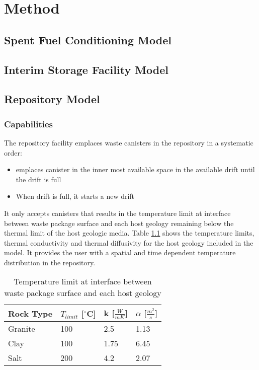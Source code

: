 \chapter{Method}

\section{Spent Fuel Conditioning Model}

\section{Interim Storage Facility Model}

\section{Repository Model}

\subsection{Capabilities}
The repository facility emplaces waste canisters in the repository 
in a systematic order: 
\begin{itemize}
    \item emplaces canister in the inner most available space 
    in the available drift until the drift is full 
    \item When drift is full, it starts a new drift
\end{itemize}
It only accepts canisters that results in the temperature limit at
interface between waste package surface and each host geology 
remaining below the thermal limit of the host geologic media. 
Table \ref{tab:temp_limit} shows the temperature limits, thermal 
conductivity and thermal diffusivity for the host geology included 
in the model. 
It provides the user with a spatial and time dependent temperature 
distribution in the repository. 

\begin{table}[h]
    \centering
	\label{tab:temp_limit}
    \caption{Temperature limit at interface between waste package 
    surface and each host geology \cite{sutton_investigations_2011}}
	\begin{tabular}{|l|l|l|l|}
	\hline
	Rock Type & $T_{limit}$ [$^\circ$C] & k [$\frac{W}{mK}$] &  $\alpha$ [$\frac{m^2}{s}$]  \\ \hline
	Granite   & 100 & 2.5  & 1.13\\ \hline
	Clay      & 100 & 1.75 & 6.45\\ \hline
	Salt      & 200 & 4.2  & 2.07\\ \hline
	\end{tabular}
\end{table}

